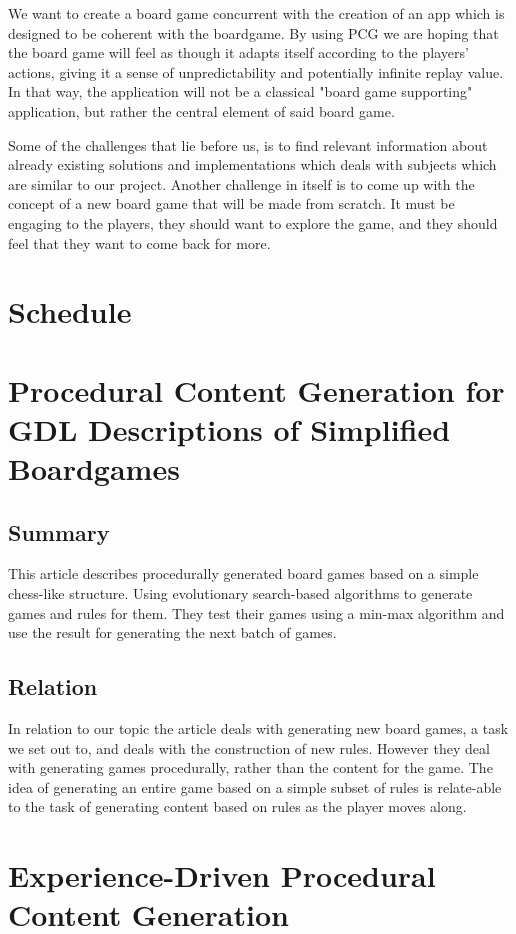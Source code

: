 \documentclass[a4paper,11pt]{article}
\begin{document}
We want to create a board game concurrent with the creation of an app which is designed to be coherent with the boardgame. By using PCG we are hoping that the board game will feel as though it adapts itself according to the players' actions, giving it a sense of unpredictability and potentially infinite replay value. In that way, the application will not be a classical "board game supporting" application, but rather the central element of said board game.

Some of the challenges that lie before us, is to find relevant information about already existing solutions and implementations which deals with subjects which are similar to our project. 
Another challenge in itself is to come up with the concept of a new board game that will be made from scratch. It must be engaging to the players, they should want to explore the game, and they should feel that they want to come back for more.
\section{Schedule}


\section{Procedural Content Generation for GDL Descriptions of Simplified Boardgames}
\subsection{Summary}
This article describes procedurally generated board games based on a simple chess-like structure. 
Using evolutionary search-based algorithms to generate games and rules for them. 
They test their games using a min-max algorithm and use the result for generating the next batch of games.

\subsection{Relation}
In relation to our topic the article deals with generating new board games, a task we set out to, and deals with the construction of new rules. 
However they deal with generating games procedurally, rather than the content for the game. 
The idea of generating an entire game based on a simple subset of rules is relate-able to the task of generating content based on rules as the player moves along. 
\pagebreak

\section{Experience-Driven Procedural Content Generation}
\pagebreak
{}


\pagebreak
\end{document}
